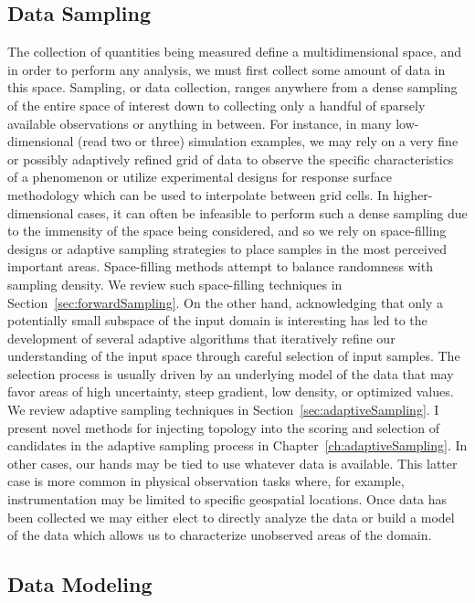 \subsection{Data Sampling}

The collection of quantities being measured define a multidimensional space, and in order to perform any analysis, we must first collect some amount of data in this space.
%
Sampling, or data collection, ranges anywhere from a dense sampling of the entire space of interest down to collecting only a handful of sparsely available observations or anything in between.
%
For instance, in many low-dimensional (read two or three) simulation examples, we may rely on a very fine or possibly adaptively refined grid of data to observe the specific characteristics of a phenomenon or utilize experimental designs for response surface methodology which can be used to interpolate between grid cells.
%
In higher-dimensional cases, it can often be infeasible to perform such a dense sampling due to the immensity of the space being considered, and so we rely on space-filling designs or adaptive sampling strategies to place samples in the most perceived important areas.
%
Space-filling methods attempt to balance randomness with sampling density.
%
We review such space-filling techniques in Section~\ref{sec:forwardSampling}.
%
On the other hand, acknowledging that only a potentially small subspace of the input domain is interesting has led to the development of several adaptive algorithms that iteratively refine our understanding of the input space through careful selection of input samples.
%
The selection process is usually driven by an underlying model of the data that may favor areas of high uncertainty, steep gradient, low density, or optimized values.
%
We review adaptive sampling techniques in Section~\ref{sec:adaptiveSampling}.
%
I present novel methods for injecting topology into the scoring and selection of candidates in the adaptive sampling process in Chapter~\ref{ch:adaptiveSampling}.
%
In other cases, our hands may be tied to use whatever data is available.
%
This latter case is more common in physical observation tasks where, for example, instrumentation may be limited to specific geospatial locations.
%
Once data has been collected we may either elect to directly analyze the data or build a model of the data which allows us to characterize unobserved areas of the domain.

\subsection{Data Modeling}

